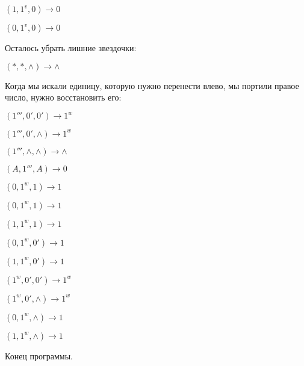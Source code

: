 \documentclass[12pt,a4paper]{article}
\begin{document}
$(1,1^v,0)\to 0$

$(0,1^v,0)\to 0$

Осталось убрать лишние звездочки:

$(*,*,\wedge)\to \wedge$

Когда мы искали единицу, которую нужно перенести влево, мы портили правое число, нужно восстановить его:

$(1''',0',0')\to 1^w$

$(1''',0',\wedge)\to 1^w$

$(1''',\wedge,\wedge)\to \wedge$

$(A,1''',A)\to 0$

$(0,1^w,1)\to 1$

$(0,1^w,1)\to 1$

$(1,1^w,1)\to 1$

$(0,1^w,0')\to 1$

$(1,1^w,0')\to 1$

$(1^w,0',0')\to 1^w$

$(1^w,0',\wedge)\to 1^w$

$(0,1^w,\wedge)\to 1$

$(1,1^w,\wedge)\to 1$

Конец программы.
\end{document}
